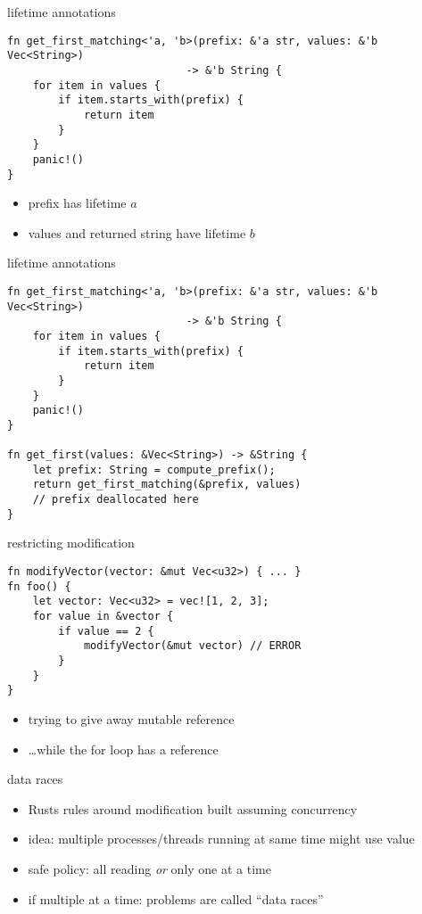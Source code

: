 \begin{frame}[fragile,label=lifetimeAnnot]{lifetime annotations}
    \begin{verbatim}
fn get_first_matching<'a, 'b>(prefix: &'a str, values: &'b Vec<String>)
                            -> &'b String {
    for item in values {
        if item.starts_with(prefix) {
            return item
        }
    }
    panic!()
}
\end{verbatim}
\begin{itemize}
    \item prefix has lifetime $a$
    \item values and returned string have lifetime $b$
\end{itemize}
\end{frame}

\begin{frame}[fragile,label=lifetimeAnnot2]{lifetime annotations}
    \begin{verbatim}
fn get_first_matching<'a, 'b>(prefix: &'a str, values: &'b Vec<String>)
                            -> &'b String {
    for item in values {
        if item.starts_with(prefix) {
            return item
        }
    }
    panic!()
}

fn get_first(values: &Vec<String>) -> &String {
    let prefix: String = compute_prefix();
    return get_first_matching(&prefix, values)
    // prefix deallocated here
}
\end{verbatim}
\end{frame}


\begin{frame}[fragile,label=restrictMod]{restricting modification}
    \begin{verbatim}
fn modifyVector(vector: &mut Vec<u32>) { ... }
fn foo() {
    let vector: Vec<u32> = vec![1, 2, 3];
    for value in &vector {
        if value == 2 {
            modifyVector(&mut vector) // ERROR
        }
    }
}
    \end{verbatim}
\begin{itemize}
    \item trying to give away mutable reference
    \item \ldots while the for loop has a reference
\end{itemize}
\end{frame}

\begin{frame}{data races}
    \begin{itemize}
    \item Rusts rules around modification built assuming concurrency
    \item idea: multiple processes/threads running at same time might use value
    \item safe policy: all reading \textit{or} only one at a time
    \item if multiple at a time: problems are called ``data races''
    \end{itemize}
\end{frame}

